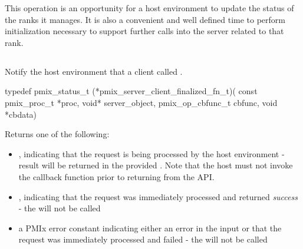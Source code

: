 \advicermstart
 This operation is an opportunity for a host environment
 to update the status of the ranks it manages.  It is also a convenient and well defined time to perform initialization necessary to
 support further calls into the server related to that rank.
 \advicermend

\subsection{}

\summary

Notify the host environment that a client called .

\format

\cspecificstart
\begin{codepar}
typedef pmix_status_t (*pmix_server_client_finalized_fn_t)(
                             const pmix_proc_t *proc,
                             void* server_object,
                             pmix_op_cbfunc_t cbfunc,
                             void *cbdata)
\end{codepar}
\cspecificend

\begin{arglist}
\end{arglist}

Returns one of the following:

\begin{itemize}
    \item {}, indicating that the request is being processed by the host environment - result will be returned in the provided . Note that the host must not invoke the callback function prior to returning from the \ac{API}.
    \item {}, indicating that the request was immediately processed and returned \textit{success} - the  will not be called
    \item a PMIx error constant indicating either an error in the input or that the request was immediately processed and failed - the  will not be called
\end{itemize}

